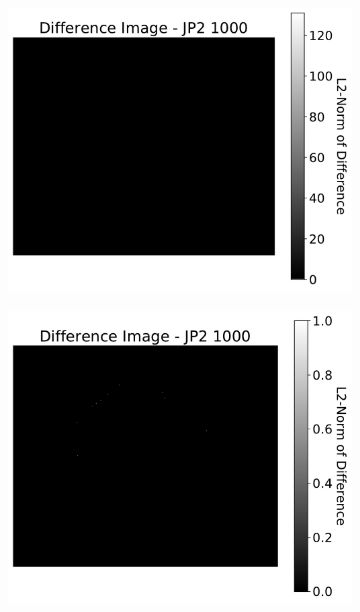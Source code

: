 \begin{figure}[htb]
\begin{subfigure}[b]{0.48\textwidth}
        \caption{}
        \label{fig:img_quality_comp_jp2_1000_histo}
    \end{subfigure}
    \\
    \begin{subfigure}[b]{0.48\textwidth}
        \centering
        \includegraphics[width=\textwidth]{doc/thesis/0_figures/compare_quality/set1/jp2_1000_diff_heatmap}
        \caption{}
        \label{fig:img_quality_comp_jp2_1000_diff}
    \end{subfigure}
    \begin{subfigure}[b]{0.48\textwidth}
        \centering
        \includegraphics[width=\textwidth]{doc/thesis/0_figures/compare_quality/set1/jp2_1000_diff_heatmap_rel}

\end{subfigure}
\end{figure}
